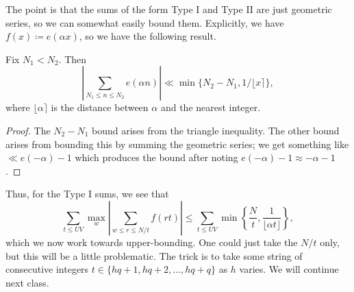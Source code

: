\documentclass[../notes.tex]{subfiles}
\begin{document}
The point is that the sums of the form Type I and Type II are just geometric series, so we can somewhat easily bound them. Explicitly, we have $f(x)\coloneqq e(\alpha x)$, so we have the following result.
\begin{lemma}
	Fix $N_1<N_2$. Then
	\[\left|\sum_{N_1\le n\le N_2}e(\alpha n)\right|\ll\min\{N_2-N_1,1/\lfloor x\rceil\},\]
	where $\lfloor\alpha\rceil$ is the distance between $\alpha$ and the nearest integer.
\end{lemma}
\begin{proof}
	The $N_2-N_1$ bound arises from the triangle inequality. The other bound arises from bounding this by summing the geometric series; we get something like $\ll e(-\alpha)-1$ which produces the bound after noting $e(-\alpha)-1\approx-\alpha-1$.
\end{proof}
Thus, for the Type I sums, we see that
\[\sum_{t\le UV}\max_w\left|\sum_{w\le r\le N/t}f(rt)\right|\le\sum_{t\le UV}\min\left\{\frac Nt,\frac1{\lfloor\alpha t\rfloor}\right\},\]
which we now work towards upper-bounding. One could just take the $N/t$ only, but this will be a little problematic. The trick is to take some string of consecutive integers $t\in\{hq+1,hq+2,\ldots,hq+q\}$ as $h$ varies. We will continue next class.
\end{document}
